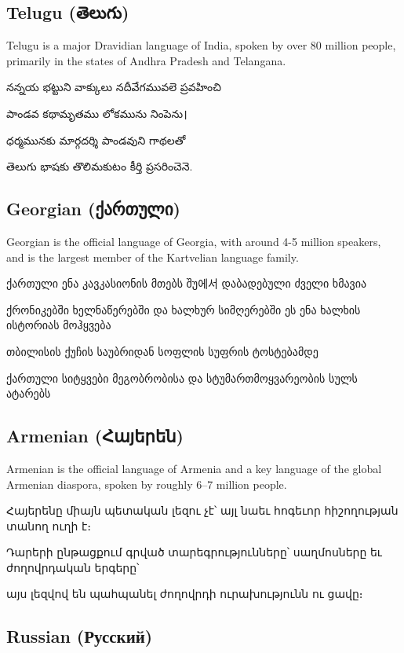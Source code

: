 \documentclass{article}
\begin{document}
\subsection{Telugu (తెలుగు)}\label{telugu}

Telugu is a major Dravidian language of India, spoken by over 80 million people, primarily in the states of Andhra Pradesh and Telangana.

నన్నయ భట్టుని వాక్కులు నదీవేగమువలె ప్రవహించి

పాండవ కథామృతము లోకమును నింపెను।

ధర్మమునకు మార్గదర్శి పాండవుని గాథలతో

తెలుగు భాషకు తొలిమకుటం కీర్తి ప్రసరించెనె.

\subsection{Georgian (ქართული)}\label{georgian}

Georgian is the official language of Georgia, with around 4-5 million speakers, and is the largest member of the Kartvelian language family.

ქართული ენა კავკასიონის მთებს შუ에서 დაბადებული ძველი ხმავია

ქრონიკებში ხელნაწერებში და ხალხურ სიმღერებში ეს ენა ხალხის ისტორიას მოჰყვება

თბილისის ქუჩის საუბრიდან სოფლის სუფრის ტოსტებამდე

ქართული სიტყვები მეგობრობისა და სტუმართმოყვარეობის სულს ატარებს

\subsection{Armenian (Հայերեն)}\label{armenian}

Armenian is the official language of Armenia and a key language of the global Armenian diaspora, spoken by roughly 6–7 million people.

Հայերենը միայն պետական լեզու չէ՝ այլ նաեւ հոգեւոր հիշողության տանող ուղի է։

Դարերի ընթացքում գրված տարեգրությունները՝ սաղմոսները եւ ժողովրդական երգերը՝

այս լեզվով են պահպանել ժողովրդի ուրախությունն ու ցավը։

\subsection{Russian ({\cyrillicsfont Русский})}\label{russian}
\end{document}
